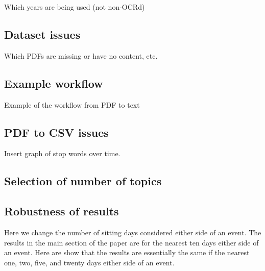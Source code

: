 \documentclass[12pt,]{article}
\begin{document}
Which years are being used (not non-OCRd)

\subsection{Dataset issues}\label{dataset-issues}

Which PDFs are missing or have no content, etc.

\subsection{Example workflow}\label{example-workflow}

Example of the workflow from PDF to text

\subsection{PDF to CSV issues}\label{pdf-to-csv-issues}

Insert graph of stop words over time.

\subsection{Selection of number of
topics}\label{selection-of-number-of-topics}

\subsection{Robustness of results}\label{robustness-of-results}

Here we change the number of sitting days considered either side of an
event. The results in the main section of the paper are for the nearest
ten days either side of an event. Here are show that the results are
essentially the same if the nearest one, two, five, and twenty days
either side of an event.

\newpage




\newpage
\singlespacing 
\renewcommand\refname{References}

\end{document}
